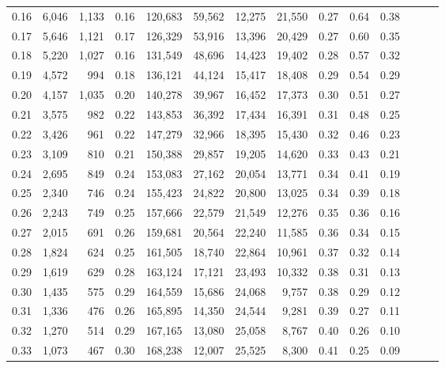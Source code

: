 \begin{tabular}{rrrrrrrrrrrrrr}
0.16 &   6,046 &  1,133 &  0.16 &  120,683 &   59,562 &  12,275 &  21,550 &  0.27 &  0.64 &      0.38 \\
0.17 &   5,646 &  1,121 &  0.17 &  126,329 &   53,916 &  13,396 &  20,429 &  0.27 &  0.60 &      0.35 \\
0.18 &   5,220 &  1,027 &  0.16 &  131,549 &   48,696 &  14,423 &  19,402 &  0.28 &  0.57 &      0.32 \\
0.19 &   4,572 &    994 &  0.18 &  136,121 &   44,124 &  15,417 &  18,408 &  0.29 &  0.54 &      0.29 \\
0.20 &   4,157 &  1,035 &  0.20 &  140,278 &   39,967 &  16,452 &  17,373 &  0.30 &  0.51 &      0.27 \\
0.21 &   3,575 &    982 &  0.22 &  143,853 &   36,392 &  17,434 &  16,391 &  0.31 &  0.48 &      0.25 \\
0.22 &   3,426 &    961 &  0.22 &  147,279 &   32,966 &  18,395 &  15,430 &  0.32 &  0.46 &      0.23 \\
0.23 &   3,109 &    810 &  0.21 &  150,388 &   29,857 &  19,205 &  14,620 &  0.33 &  0.43 &      0.21 \\
0.24 &   2,695 &    849 &  0.24 &  153,083 &   27,162 &  20,054 &  13,771 &  0.34 &  0.41 &      0.19 \\
0.25 &   2,340 &    746 &  0.24 &  155,423 &   24,822 &  20,800 &  13,025 &  0.34 &  0.39 &      0.18 \\
0.26 &   2,243 &    749 &  0.25 &  157,666 &   22,579 &  21,549 &  12,276 &  0.35 &  0.36 &      0.16 \\
0.27 &   2,015 &    691 &  0.26 &  159,681 &   20,564 &  22,240 &  11,585 &  0.36 &  0.34 &      0.15 \\
0.28 &   1,824 &    624 &  0.25 &  161,505 &   18,740 &  22,864 &  10,961 &  0.37 &  0.32 &      0.14 \\
0.29 &   1,619 &    629 &  0.28 &  163,124 &   17,121 &  23,493 &  10,332 &  0.38 &  0.31 &      0.13 \\
0.30 &   1,435 &    575 &  0.29 &  164,559 &   15,686 &  24,068 &   9,757 &  0.38 &  0.29 &      0.12 \\
0.31 &   1,336 &    476 &  0.26 &  165,895 &   14,350 &  24,544 &   9,281 &  0.39 &  0.27 &      0.11 \\
0.32 &   1,270 &    514 &  0.29 &  167,165 &   13,080 &  25,058 &   8,767 &  0.40 &  0.26 &      0.10 \\
0.33 &   1,073 &    467 &  0.30 &  168,238 &   12,007 &  25,525 &   8,300 &  0.41 &  0.25 &      0.09 \\

\end{tabular}
